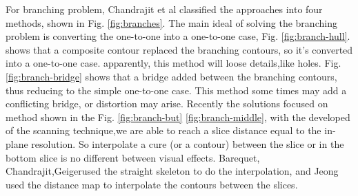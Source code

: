 \documentclass[3p,times]{elsarticle}
\begin{document}
For branching problem, Chandrajit et al classified  the approaches into four
methods, shown in Fig. \ref{fig:branches}. The main ideal of solving
the branching problem is converting the one-to-one into a one-to-one
case, Fig. \ref{fig:branch-hull}. shows that a composite contour replaced the branching contours\cite{meyers_surfaces_1992}, so it's converted into a
one-to-one case. apparently, this method will loose details,like
holes. Fig. \ref{fig:branch-bridge} shows that a bridge added between
the branching
contours\cite{barequet_piecewise-linear_1996,christiansen_conversion_1978},
thus reducing to the simple one-to-one case. This method some times
may add a conflicting bridge, or distortion may arise. Recently the
solutions focused on method shown in the Fig. \ref{fig:branch-but}
\ref{fig:branch-middle}, with the developed of the scanning technique,we are
able to reach a slice distance equal to the in-plane resolution. So
interpolate a cure (or a contour) between the slice or in the bottom
slice is no different between visual
effects. Barequet\cite{barequet_reconstruction_2009},
Chandrajit\cite{bajaj_arbitrary_1996},Geiger\cite{geiger_three-dimensional_1993}used
the straight skeleton to do the interpolation, and
Jeong\cite{jeong_b-spline_1999} used the distance map to interpolate
the contours between the slices.
\end{document}
